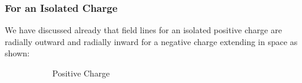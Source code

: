 \subsubsection{For an Isolated Charge}
We have discussed already that field lines for an isolated positive charge are radially outward and radially 
inward for a negative charge extending in space as shown:
\begin{figure}[htbp]
  \centering
  \begin{subfigure}[t]{0.3\textwidth}
      \caption{Positive Charge}
      \label{fig:11.5a}
  \end{subfigure}
  \begin{subfigure}[t]{0.3\textwidth}

\end{subfigure}
\end{figure}
